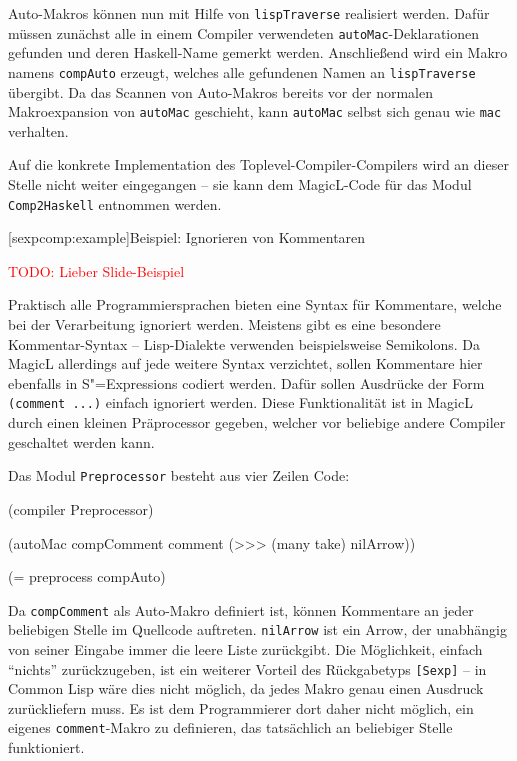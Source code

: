 \documentclass[11pt, a4paper, bibgerm]{scrbook}
\newenvironment{DIFnomarkup}{}{}
\newcommand\icode[1]{\lstinline?#1?}
\newcommand{\todo}[1]{
  \textcolor{red}{TODO: #1}
}
\newcommand\lsection{}
\newcommand{\sexps}{S"=Expressions}
\begin{document}
Auto-Makros können nun mit Hilfe von \icode{lispTraverse} realisiert
werden. Dafür müssen zunächst alle in einem Compiler verwendeten
\icode{autoMac}-Deklarationen gefunden und deren Haskell-Name gemerkt
werden. Anschließend wird ein Makro namens \icode{compAuto} erzeugt,
welches alle gefundenen Namen an \icode{lispTraverse}
übergibt. Da das Scannen von Auto-Makros bereits vor der
normalen Makroexpansion von \icode{autoMac} geschieht, kann
\icode{autoMac} selbst sich genau wie \icode{mac} verhalten.

Auf die konkrete Implementation des Toplevel-Compiler-Compilers wird an
dieser Stelle nicht weiter eingegangen -- sie kann dem MagicL-Code
für das Modul \icode{Comp2Haskell} entnommen werden.

\lsection[sexpcomp:example]{Beispiel: Ignorieren von Kommentaren}

\todo{Lieber Slide-Beispiel}

Praktisch alle Programmiersprachen bieten eine Syntax für Kommentare,
welche bei der Verarbeitung ignoriert werden. Meistens gibt es eine
besondere Kommentar-Syntax -- Lisp-Dialekte verwenden beispielsweise
Semikolons. Da MagicL allerdings auf jede weitere Syntax verzichtet,
sollen Kommentare hier ebenfalls in \sexps{} codiert werden. Dafür
sollen Ausdrücke der Form \icode{(comment ...)}  einfach ignoriert
werden. Diese Funktionalität ist in MagicL durch einen kleinen
{Präprocessor} gegeben, welcher vor beliebige andere Compiler geschaltet
werden kann.

Das Modul \icode{Preprocessor} besteht aus vier Zeilen Code:
\begin{DIFnomarkup}\begin{code}
(compiler Preprocessor)

(autoMac compComment comment
         (>>> (many take) nilArrow))

(= preprocess compAuto)  
\end{code}\end{DIFnomarkup}
Da \icode{compComment} als Auto-Makro definiert ist, können Kommentare
an jeder beliebigen Stelle im Quellcode auftreten. \icode{nilArrow} ist
ein Arrow, der unabhängig von seiner Eingabe immer die leere Liste
zurückgibt. Die Möglichkeit, einfach ``nichts'' zurückzugeben, ist ein
weiterer Vorteil des Rückgabetyps \icode{[Sexp]} -- in Common Lisp wäre
dies nicht möglich, da jedes Makro genau einen Ausdruck zurückliefern
muss. Es ist dem Programmierer dort daher nicht möglich, ein eigenes
\icode{comment}-Makro zu definieren, das tatsächlich an beliebiger
Stelle funktioniert.
\end{document}
